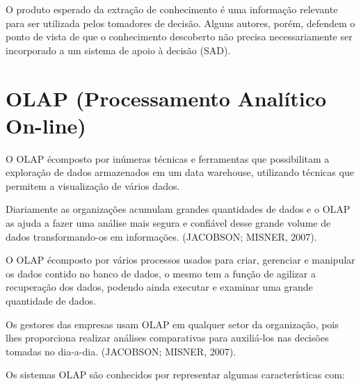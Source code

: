 O produto esperado da extra\c{c}\~{a}o de conhecimento \'{e} uma informa\c{c}\~{a}o relevante para ser utilizada pelos tomadores de decis\~{a}o. Alguns autores, por\'{e}m, defendem o ponto de vista de que o conhecimento descoberto n\~{a}o precisa necessariamente ser incorporado a um sistema de apoio \`{a} decis\~{a}o (SAD).

\section{OLAP (Processamento Anal\'{i}tico On-line)}

O OLAP \'{e}composto por inúmeras t\'{e}cnicas e ferramentas que possibilitam a explora\c{c}\~{a}o de dados armazenados em um data warehouse, utilizando t\'{e}cnicas que permitem a visualiza\c{c}\~{a}o de v\'{a}rios dados. 

Diariamente as organiza\c{c}\~{o}es acumulam grandes quantidades de dados e o OLAP as ajuda a fazer uma an\'{a}lise mais segura e confi\'{a}vel desse grande volume de dados transformando-os em informa\c{c}\~{o}es. (JACOBSON; MISNER, 2007).

O OLAP \'{e}composto por v\'{a}rios processos usados para criar, gerenciar e manipular os dados contido no banco de dados, o mesmo tem a fun\c{c}\~{a}o de agilizar a recupera\c{c}\~{a}o dos dados, podendo ainda executar e examinar uma grande quantidade de dados. 

Os gestores das empresas usam OLAP em qualquer setor da organiza\c{c}\~{a}o, pois lhes proporciona realizar an\'{a}lises comparativas para auxili\'{a}-los nas decis\~{o}es tomadas no dia-a-dia. (JACOBSON; MISNER, 2007).

Os sistemas OLAP s\~{a}o conhecidos por representar algumas caracter\'{i}sticas com:

